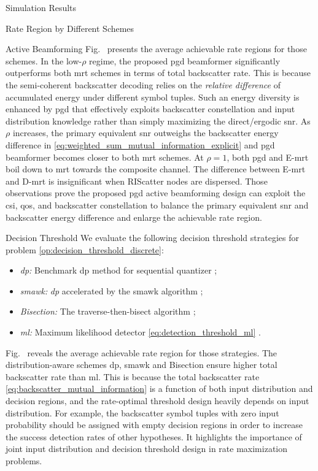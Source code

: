 \documentclass[journal]{IEEEtran}
\begin{document}
\begin{section}{Simulation Results}
\begin{subsection}{Rate Region by Different Schemes}
\begin{subsubsection}{Active Beamforming}
			Fig.~ presents the average achievable rate regions for those schemes.
			In the low-$\rho$ regime, the proposed \gls{pgd} beamformer significantly outperforms both \gls{mrt} schemes in terms of total backscatter rate.
			This is because the semi-coherent backscatter decoding relies on the \emph{relative difference} of accumulated energy under different symbol tuples.
			Such an energy diversity is enhanced by \gls{pgd} that effectively exploits backscatter constellation and input distribution knowledge rather than simply maximizing the direct/ergodic \gls{snr}.
			As $\rho$ increases, the primary equivalent \gls{snr} outweighs the backscatter energy difference in \eqref{eq:weighted_sum_mutual_information_explicit} and \gls{pgd} beamformer becomes closer to both \gls{mrt} schemes.
			At $\rho=1$, both \gls{pgd} and E-\gls{mrt} boil down to \gls{mrt} towards the composite channel.
			The difference between E-\gls{mrt} and D-\gls{mrt} is insignificant when RIScatter nodes are dispersed.
			Those observations prove the proposed \gls{pgd} active beamforming design can exploit the \gls{csi}, \gls{qos}, and backscatter constellation to balance the primary equivalent \gls{snr} and backscatter energy difference and enlarge the achievable rate region.
		\end{subsubsection}

		\begin{subsubsection}{Decision Threshold}
			We evaluate the following decision threshold strategies for problem \eqref{op:decision_threshold_discrete}:
			\begin{itemize}
				\item \emph{\gls{dp}:} Benchmark \gls{dp} method for sequential quantizer \cite{He2021};
				\item \emph{\gls{smawk}:} \emph{\gls{dp}} accelerated by the \gls{smawk} algorithm \cite{He2021};
				\item \emph{Bisection:} The traverse-then-bisect algorithm \cite{Nguyen2020a};
				\item \emph{\gls{ml}:} Maximum likelihood detector \eqref{eq:detection_threshold_ml} \cite{Qian2019}.
			\end{itemize}

			Fig.~ reveals the average achievable rate region for those strategies.
			The distribution-aware schemes \gls{dp}, \gls{smawk} and Bisection ensure higher total backscatter rate than \gls{ml}.
			This is because the total backscatter rate \eqref{eq:backscatter_mutual_information} is a function of both input distribution and decision regions, and the rate-optimal threshold design heavily depends on input distribution.
			For example, the backscatter symbol tuples with zero input probability should be assigned with empty decision regions in order to increase the success detection rates of other hypotheses.
			It highlights the importance of joint input distribution and decision threshold design in rate maximization problems.
		\end{subsubsection}


\end{subsection}
\end{section}
\end{document}
